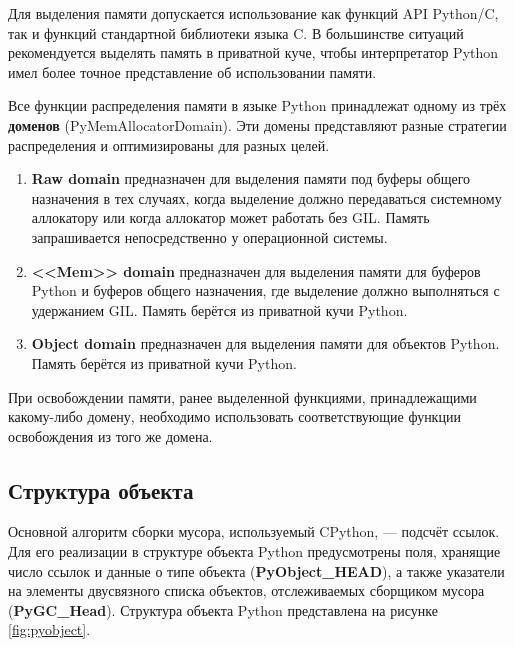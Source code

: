 Для выделения памяти допускается использование как функций API Python/C, так и функций стандартной библиотеки языка C. В большинстве ситуаций рекомендуется выделять память в приватной куче, чтобы интерпретатор Python имел более точное представление об использовании памяти. \cite{python_memory}

Все функции распределения памяти в языке Python принадлежат одному из трёх \textbf{доменов} (PyMemAllocatorDomain). Эти домены представляют разные стратегии распределения и оптимизированы для разных целей. \cite{python_memory}

\begin{enumerate}[label*=\arabic*.]
	\item \textbf{Raw domain} предназначен для выделения памяти под буферы общего назначения в тех случаях, когда выделение должно передаваться системному аллокатору или когда аллокатор может работать без GIL. Память запрашивается непосредственно у операционной системы.
	\item \textbf{<<Mem>> domain} предназначен для выделения памяти для буферов Python и буферов общего назначения, где выделение должно выполняться с удержанием GIL. Память берётся из приватной кучи Python.
	\item \textbf{Object domain} предназначен для выделения памяти для объектов Python. Память берётся из приватной кучи Python.
\end{enumerate}

При освобождении памяти, ранее выделенной функциями, принадлежащими какому-либо домену, необходимо использовать соответствующие функции освобождения из того же домена. \cite{python_memory}



\subsection{Структура объекта}

Основной алгоритм сборки мусора, используемый CPython, --- подсчёт ссылок. Для его реализации в структуре объекта Python предусмотрены поля, хранящие число ссылок и данные о типе объекта (\textbf{PyObject\_HEAD}), а также указатели на элементы двусвязного списка объектов, отслеживаемых сборщиком мусора (\textbf{PyGC\_Head}). Структура объекта Python представлена на рисунке \ref{fig:pyobject}.~\cite{python_gc}

